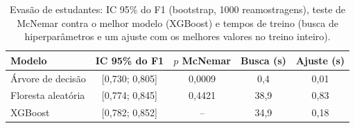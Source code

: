 \begin{table}[!t]
\centering
\caption{Evasão de estudantes: IC 95\% do F1 (bootstrap, 1000 reamostragens), teste de McNemar contra o melhor modelo (XGBoost) e tempos de treino (busca de hiperparâmetros e um ajuste com os melhores valores no treino inteiro).}
\label{tab:estudantes_sig}
\begin{tabular}{lcccc}
\hline
Modelo & IC 95\% do F1 & $p$ McNemar & Busca (s) & Ajuste (s) \\
\hline
Árvore de decisão & [0,730; 0,805] & 0,0009 & 0,4 & 0,01 \\
Floresta aleatória & [0,774; 0,845] & 0,4421 & 38,9 & 0,83 \\
XGBoost & [0,782; 0,852] & -- & 34,9 & 0,18 \\
\hline
\end{tabular}
\end{table}